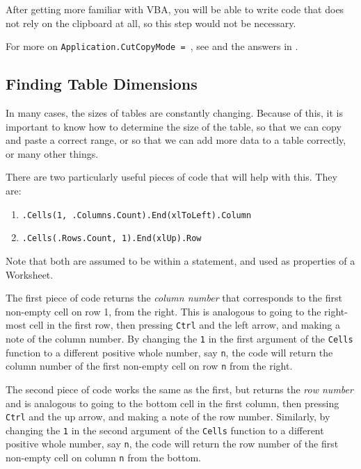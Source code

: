 \documentclass[11pt]{article}%
\begin{document}
After getting more familiar with VBA, you will be able to write code that does not rely on the clipboard at all, so this step would not be necessary.

For more on \texttt{Application.CutCopyMode = }, see \cite{ApplicationOnKey} and the answers in \cite{StackOverflowCutCopyMode}.


\subsection{Finding Table Dimensions}\label{subsec:FindingTableDimensions}

In many cases, the sizes of tables are constantly changing. Because of this, it is important to know how to determine the size of the table, so that we can copy and paste a correct range, or so that we can add more data to a table correctly, or many other things.

There are two particularly useful pieces of code that will help with this. They are:

\begin{enumerate}
    \item \texttt{.Cells(1, .Columns.Count).End(xlToLeft).Column}
    \item \texttt{.Cells(.Rows.Count, 1).End(xlUp).Row}
\end{enumerate}

Note that both are assumed to be within a \texttt{} statement, and used as properties of a Worksheet.

The first piece of code returns the \textit{column number} that corresponds to the first non-empty cell on row 1, from the right. This is analogous to going to the right-most cell in the first row, then pressing \texttt{Ctrl} and the left arrow, and making a note of the column number. By changing the \texttt{1} in the first argument of the \texttt{Cells} function to a different positive whole number, say \texttt{n}, the code will return the column number of the first non-empty cell on row \texttt{n} from the right.

The second piece of code works the same as the first, but returns the \textit{row number} and is analogous to going to the bottom cell in the first column, then pressing \texttt{Ctrl} and the up arrow, and making a note of the row number. Similarly, by changing the \texttt{1} in the second argument of the \texttt{Cells} function to a different positive whole number, say \texttt{n}, the code will return the row number of the first non-empty cell on column \texttt{n} from the bottom.
\end{document}
